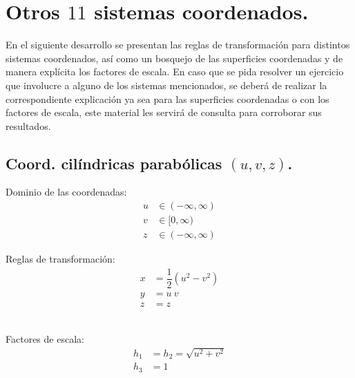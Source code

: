 \section{Otros \texorpdfstring{$11$}{11} sistemas coordenados.}

En el siguiente desarrollo se presentan las reglas de transformación para distintos sistemas coordenados, así como un bosquejo de las superficies coordenadas y de manera explícita los factores de escala. En caso que se pida resolver un ejercicio que involucre a alguno de los sistemas mencionados, se deberá de realizar la correspondiente explicación ya sea para las superficies coordenadas o con los factores de escala, este material les servirá de consulta para corroborar sus resultados.

\subsection{Coord. cilíndricas parabólicas \texorpdfstring{$(u, v, z)$}{(u, v, z)}.}

\begin{minipage}{0.45\textwidth}
Dominio de las coordenadas:
\begin{align*}
u &\in (-\infty,\infty) \\
v &\in [0,\infty) \\
z &\in(-\infty,\infty)
\end{align*}
\end{minipage}
\hspace{1cm}
\begin{minipage}{0.4\textwidth}
Reglas de transformación:
\begin{align*}
x &= \dfrac{1}{2}(u^{2 } -v^{2}) \\
y &= u \: v \\
z &=z
\end{align*}
\end{minipage}
\\[0.75em]
Factores de escala:
\begin{align*}
h_{1 } &= h_{2} = \sqrt{u^{2 } +v^{2}} \\
h_{3 } &= 1
\end{align*}

